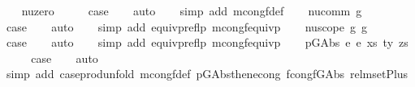 \begin{isabellebody}
\isamarkupfalse%
\isanewline
\ \ \isamarkupfalse%
\ nu{\isacharunderscore}{\kern0pt}zero\isanewline
\ \ \isamarkupfalse%
\ \isamarkupfalse%
\ {\isacharquery}{\kern0pt}case\isanewline
\ \ \isamarkupfalse%
\ auto\isanewline
\ \ \isamarkupfalse%
\ {\isacharparenleft}{\kern0pt}simp\ add{\isacharcolon}{\kern0pt}\ mcong{\isacharunderscore}{\kern0pt}f{\isacharunderscore}{\kern0pt}def{\isacharparenright}{\kern0pt}\isanewline
{}\isamarkupfalse%
\isanewline
\ \ \isamarkupfalse%
\ {\isacharparenleft}{\kern0pt}nu{\isacharunderscore}{\kern0pt}comm\ g{\isacharparenright}{\kern0pt}\isanewline
\ \ \isamarkupfalse%
\ \isamarkupfalse%
\ {\isacharquery}{\kern0pt}case\isanewline
\ \ \isamarkupfalse%
\ auto\isanewline
\ \ \isamarkupfalse%
\ {\isacharparenleft}{\kern0pt}simp\ add{\isacharcolon}{\kern0pt}\ equivp{\isacharunderscore}{\kern0pt}reflp\ mcong{\isacharunderscore}{\kern0pt}f{\isacharunderscore}{\kern0pt}equivp{\isacharparenright}{\kern0pt}\isanewline
{}\isamarkupfalse%
\isanewline
\ \ \isamarkupfalse%
\ {\isacharparenleft}{\kern0pt}nu{\isacharunderscore}{\kern0pt}scope\ g{}\ g{}{\isacharparenright}{\kern0pt}\isanewline
\ \ \isamarkupfalse%
\ \isamarkupfalse%
\ {\isacharquery}{\kern0pt}case\isanewline
\ \ \isamarkupfalse%
\ auto\isanewline
\ \ \isamarkupfalse%
\ {\isacharparenleft}{\kern0pt}simp\ add{\isacharcolon}{\kern0pt}\ equivp{\isacharunderscore}{\kern0pt}reflp\ mcong{\isacharunderscore}{\kern0pt}f{\isacharunderscore}{\kern0pt}equivp{\isacharparenright}{\kern0pt}\isanewline
{}\isamarkupfalse%
\isanewline
\ \ \isamarkupfalse%
\ {\isacharparenleft}{\kern0pt}p{\isacharunderscore}{\kern0pt}GAbs\ e{}\ e{}\ xs\ ty\ zs{\isacharparenright}{\kern0pt}\isanewline
\ \ \isamarkupfalse%
\ \isamarkupfalse%
\ {\isacharquery}{\kern0pt}case\isanewline
\ \ \isamarkupfalse%
\ auto\isanewline
\ \ \isamarkupfalse%
\ {\isacharparenleft}{\kern0pt}simp\ add{\isacharcolon}{\kern0pt}\ case{\isacharunderscore}{\kern0pt}prod{\isacharunderscore}{\kern0pt}unfold\ mcong{\isacharunderscore}{\kern0pt}f{\isacharunderscore}{\kern0pt}def\ p{\isacharunderscore}{\kern0pt}GAbs{\isacharunderscore}{\kern0pt}then{\isacharunderscore}{\kern0pt}econg\ fcong{\isachardot}{\kern0pt}f{\isacharunderscore}{\kern0pt}GAbs\ rel{\isacharunderscore}{\kern0pt}mset{\isacharunderscore}{\kern0pt}Plus{\isacharparenright}{\kern0pt}\isanewline

\end{isabellebody}
